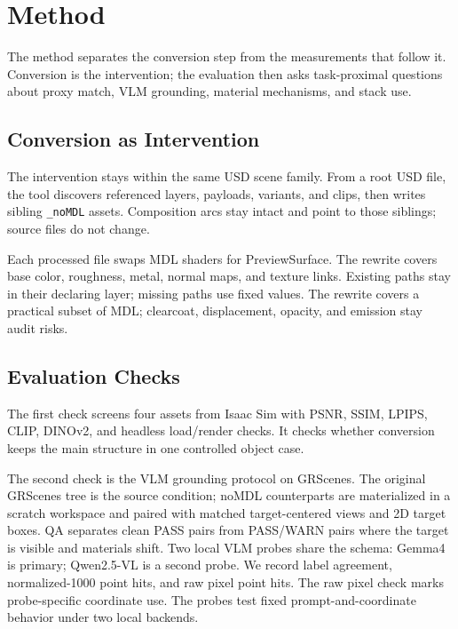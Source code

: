 \section{Method}
\label{sec:methodology}

The method separates the conversion step from the measurements that follow it.
Conversion is the intervention; the evaluation then asks task-proximal questions
about proxy match, VLM grounding, material mechanisms, and stack use.

\subsection{Conversion as Intervention}
\label{sec:conversion_intervention}

The intervention stays within the same USD scene family. From a root USD file,
the tool discovers referenced layers, payloads, variants, and clips, then
writes sibling \texttt{\_noMDL} assets. Composition arcs stay intact and point
to those siblings; source files do not change.

Each processed file swaps MDL shaders for PreviewSurface. The rewrite covers
base color, roughness, metal, normal maps, and texture links. Existing paths
stay in their declaring layer; missing paths use fixed values. The rewrite
covers a practical subset of MDL; clearcoat, displacement, opacity, and
emission stay audit risks.

\subsection{Evaluation Checks}
\label{sec:evaluation_checks}

The first check screens four assets
from Isaac Sim with PSNR, SSIM, LPIPS, CLIP, \mbox{DINOv2}, and headless
load/render checks. It checks whether conversion keeps the main structure in one
controlled object case.

The second check is the VLM grounding protocol on GRScenes. The original GRScenes tree is
the source condition; noMDL counterparts are materialized in a scratch workspace
and paired with matched target-centered views and 2D target boxes. QA separates
clean PASS pairs from PASS/WARN pairs where the target is visible and materials
shift. Two local VLM probes share the schema: Gemma4 is primary;
\mbox{Qwen2.5-VL} is a second probe. We record label agreement,
normalized-1000 point hits, and raw pixel point hits. The raw pixel check marks
probe-specific coordinate use. The probes test fixed prompt-and-coordinate
behavior under two local backends.

